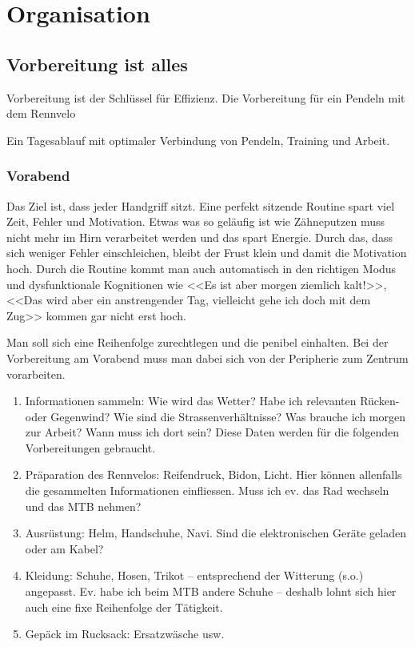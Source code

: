 \chapter{Organisation}

\section{Vorbereitung ist alles}

Vorbereitung ist der Schlüssel für Effizienz.
Die Vorbereitung für ein Pendeln mit dem Rennvelo

Ein Tagesablauf mit optimaler Verbindung von Pendeln, Training und Arbeit.

\subsection{Vorabend}

Das Ziel ist, dass jeder Handgriff sitzt.
Eine perfekt sitzende Routine spart viel Zeit, Fehler und Motivation.
Etwas was so geläufig ist wie Zähneputzen muss nicht mehr im Hirn verarbeitet werden und das spart Energie.
Durch das, dass sich weniger Fehler einschleichen, bleibt der Frust klein und damit die Motivation hoch.
Durch die Routine kommt man auch automatisch in den richtigen Modus und dysfunktionale Kognitionen wie
<<Es ist aber morgen ziemlich kalt!>>, <<Das wird aber ein anstrengender Tag, vielleicht gehe ich doch mit dem Zug>> kommen gar nicht erst hoch.

Man soll sich eine Reihenfolge zurechtlegen und die penibel einhalten.
Bei der Vorbereitung am Vorabend muss man dabei sich von der Peripherie zum Zentrum vorarbeiten.

\begin{enumerate}
  \item Informationen sammeln:
        Wie wird das Wetter?
        Habe ich relevanten Rücken- oder Gegenwind?
        Wie sind die Strassenverhältnisse?
        Was brauche ich morgen zur Arbeit?
        Wann muss ich dort sein?
    Diese Daten werden für die folgenden Vorbereitungen gebraucht.
  \item Präparation des Rennvelos: Reifendruck, Bidon, Licht.
    Hier können allenfalls die gesammelten Informationen einfliessen. Muss ich ev. das Rad wechseln und das MTB nehmen?
  \item Ausrüstung: Helm, Handschuhe, Navi. Sind die elektronischen Geräte geladen oder am Kabel?
  \item Kleidung: Schuhe, Hosen, Trikot -- entsprechend der Witterung (s.o.) angepasst.
    Ev. habe ich beim MTB andere Schuhe -- deshalb lohnt sich hier auch eine fixe Reihenfolge der Tätigkeit.
  \item Gepäck im Rucksack: Ersatzwäsche usw.
\end{enumerate}

